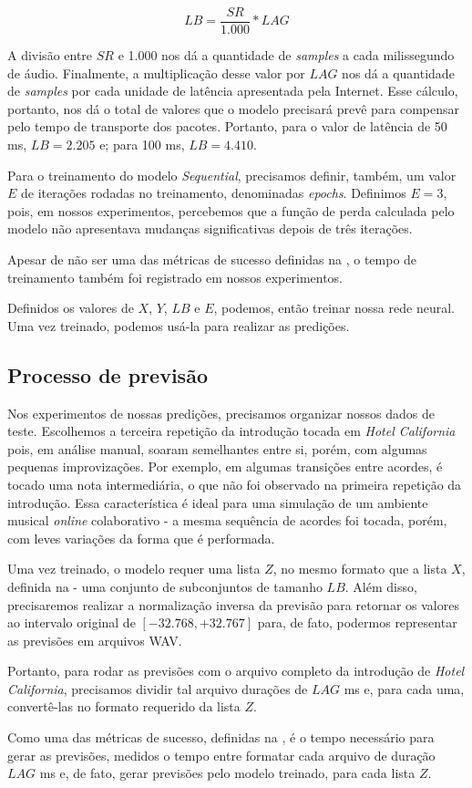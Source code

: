 \begin{equation}
    LB = \frac{SR}{1.000} * LAG
\end{equation}

A divisão entre $SR$ e 1.000 nos dá a quantidade de \textit{samples} a cada milissegundo de áudio. Finalmente, a multiplicação desse valor por $LAG$ nos dá a quantidade de \textit{samples} por cada unidade de latência apresentada pela Internet. Esse cálculo, portanto, nos dá o total de valores que o modelo precisará prevê para compensar pelo tempo de transporte dos pacotes. Portanto, para o valor de latência de 50 ms, $LB = 2.205$ e; para 100 ms, $LB = 4.410$.

Para o treinamento do modelo \textit{Sequential}, precisamos definir, também, um valor $E$ de iterações rodadas no treinamento, denominadas \textit{epochs}. Definimos $E = 3$, pois, em nossos experimentos, percebemos que a função de perda calculada pelo modelo não apresentava mudanças significativas depois de três iterações.

Apesar de não ser uma das métricas de sucesso definidas na , o tempo de treinamento também foi registrado em nossos experimentos.

Definidos os valores de $X$, $Y$, $LB$ e $E$, podemos, então treinar nossa rede neural. Uma vez treinado, podemos usá-la para realizar as predições.

\subsection{Processo de previsão}

Nos experimentos de nossas predições, precisamos organizar nossos dados de teste. Escolhemos a terceira repetição da introdução tocada em \textit{Hotel California} pois, em análise manual, soaram semelhantes entre si, porém, com algumas pequenas improvizações. Por exemplo, em algumas transições entre acordes, é tocado uma nota intermediária, o que não foi observado na primeira repetição da introdução. Essa característica é ideal para uma simulação de um ambiente musical \textit{online} colaborativo - a mesma sequência de acordes foi tocada, porém, com leves variações da forma que é performada.

Uma vez treinado, o modelo requer uma lista $Z$, no mesmo formato que a lista $X$, definida na  - uma conjunto de subconjuntos de tamanho $LB$. Além disso, precisaremos realizar a normalização inversa da previsão para retornar os valores ao intervalo original de $[-32.768, +32.767]$ para, de fato, podermos representar as previsões em arquivos WAV.

Portanto, para rodar as previsões com o arquivo completo da introdução de \textit{Hotel California}, precisamos dividir tal arquivo durações de $LAG$ ms e, para cada uma, convertê-las no formato requerido da lista $Z$.

Como uma das métricas de sucesso, definidas na , é o tempo necessário para gerar as previsões, medidos o tempo entre formatar cada arquivo de duração $LAG$ ms e, de fato, gerar previsões pelo modelo treinado, para cada lista $Z$.